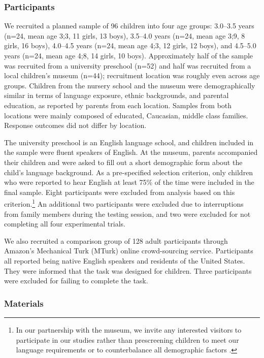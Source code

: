 \documentclass[man]{apa2}
\begin{document}
\subsubsection{Participants}

We recruited a planned sample of 96 children into four age groups: 3.0--3.5 years (n=24, mean age 3;3, 11 girls, 13 boys), 3.5--4.0 years (n=24, mean age 3;9, 8 girls, 16 boys), 4.0--4.5 years (n=24, mean age 4;3, 12 girls, 12 boys), and 4.5--5.0 years (n=24, mean age 4;8, 14 girls, 10 boys).  Approximately half of the sample was recruited from a university preschool (n=52) and half was recruited from a local children's museum (n=44); recruitment location was roughly even across age groups. Children from the nursery school and the museum were demographically similar in terms of language exposure, ethnic backgrounds, and parental education, as reported by parents from each location. Samples from both locations were mainly composed of educated, Caucasian, middle class families. Response outcomes did not differ by location.

The university preschool is an English language school, and children included in the sample were fluent speakers of English. At the museum, parents accompanied their children and were asked to fill out a short demographic form about the child's language background. As a pre-specified selection criterion, only children who were reported to hear English at least 75\% of the time were included in the final sample.  Eight participants were excluded from analysis based on this criterion.\footnote{In our partnership with the museum, we invite any interested visitors to participate in our studies rather than prescreening children to meet our language requirements or to counterbalance all demographic factors \cite{callanan2012}. }  An additional two participants were excluded due to interruptions from family members during the testing session, and two were excluded for not completing all four experimental trials. 

We also recruited a comparison group of 128 adult participants through Amazon's Mechanical Turk (MTurk) online crowd-sourcing service.  Participants all reported being native English speakers and residents of the United States. They were informed that the task was designed for children. Three participants were excluded for failing to complete the task.  

\subsubsection{Materials}
\end{document}
